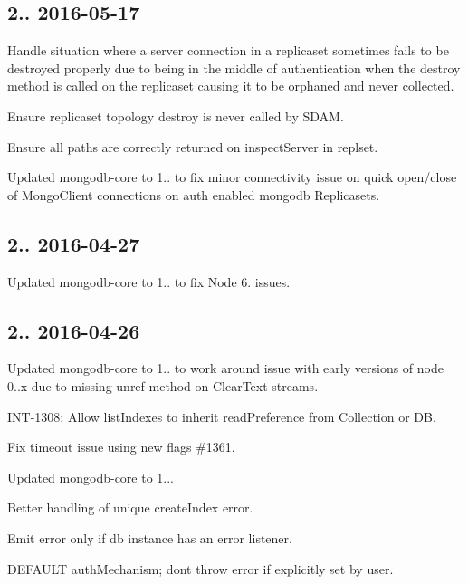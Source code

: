\subsection*{2.. 2016-\/05-\/17 }


\begin{DoxyItemize}
\item Handle situation where a server connection in a replicaset sometimes fails to be destroyed properly due to being in the middle of authentication when the destroy method is called on the replicaset causing it to be orphaned and never collected.
\item Ensure replicaset topology destroy is never called by S\+D\+AM.
\item Ensure all paths are correctly returned on inspect\+Server in replset.
\item Updated mongodb-\/core to 1.. to fix minor connectivity issue on quick open/close of Mongo\+Client connections on auth enabled mongodb Replicasets.
\end{DoxyItemize}

\subsection*{2.. 2016-\/04-\/27 }


\begin{DoxyItemize}
\item Updated mongodb-\/core to 1.. to fix Node 6. issues.
\end{DoxyItemize}

\subsection*{2.. 2016-\/04-\/26 }


\begin{DoxyItemize}
\item Updated mongodb-\/core to 1.. to work around issue with early versions of node 0..\+x due to missing unref method on Clear\+Text streams.
\item I\+N\+T-\/1308\+: Allow list\+Indexes to inherit read\+Preference from Collection or DB.
\item Fix timeout issue using new flags \#1361.
\item Updated mongodb-\/core to 1...
\item Better handling of unique create\+Index error.
\item Emit error only if db instance has an error listener.
\item D\+E\+F\+A\+U\+LT auth\+Mechanism; don\textquotesingle{}t throw error if explicitly set by user.
\end{DoxyItemize}

